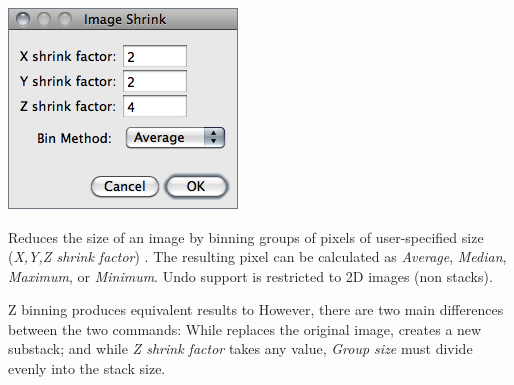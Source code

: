 

\subsubsection[\protect\userinterface{Bin\ldots{}}]{\protect{}\label{sub:Bin...}}

\begin{minipage}[c][1\totalheight][t]{0.337\columnwidth}%
\includegraphics[scale=0.55]{images/Bin}%
\end{minipage}%
\begin{minipage}[c][1\totalheight][t]{0.663\columnwidth}%
Reduces the size of an image by binning groups of pixels of user-specified
size (\emph{X,Y,Z shrink factor}) \cite{C-Binner}. The resulting
pixel can be calculated as \emph{Average}, \emph{Median}, \emph{Maximum},
or \emph{Minimum}. Undo support is restricted to 2D images (non stacks).\medskip{}


Z binning produces equivalent results to 
However, there are two main differences between the two commands:
While  replaces the original image, 
creates a new substack; and while \emph{Z shrink factor} takes any
value, \emph{Group size} must divide evenly into the stack size.%
\end{minipage}




\subsubsection[\protect\userinterface{Image to Results}]{\protect{}\label{sub:ImageToResults}}

